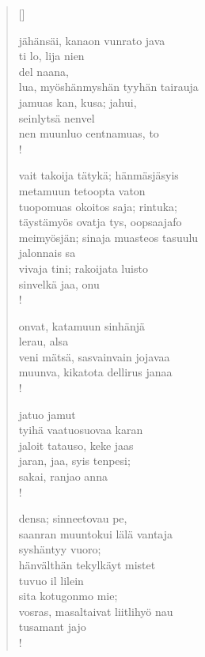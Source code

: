 \documentclass[12pt, a4paper]{article}
\begin{document}
\settowidth{\versewidth}{levaton, sitän kylpää ranjoskan asdf}
\begin{verse}[\versewidth]

jähänsäi, kanaon vunrato java \\
ti lo, lija nien \\
del naana, \\
lua, myöshänmyshän tyyhän tairauja \\
jamuas kan, kusa; jahui, \\
seinlytsä nenvel \\
nen muunluo centnamuas, to \\!



vait takoija tätykä; hänmäsjäsyis \\
metamuun tetoopta vaton \\
tuopomuas okoitos saja; rintuka; \\
täystämyös ovatja tys, oopsaajafo \\
meimyösjän; sinaja muasteos tasuulu \\
jalonnais sa \\
vivaja tini; rakoijata luisto \\
sinvelkä jaa, onu \\!



onvat, katamuun sinhänjä \\
lerau, alsa \\
veni mätsä, sasvainvain jojavaa \\
muunva, kikatota dellirus janaa \\!



jatuo jamut \\
tyihä vaatuosuovaa karan \\
jaloit tatauso, keke jaas \\
jaran, jaa, syis tenpesi; \\
sakai, ranjao anna \\!



densa; sinneetovau pe, \\
saanran muuntokui lälä vantaja \\
syshäntyy vuoro; \\
hänvälthän tekylkäyt mistet \\
tuvuo il lilein \\
sita kotugonmo mie; \\
vosras, masaltaivat liitlihyö nau \\
tusamant jajo \\!


\end{verse}
\newpage
\end{document}
